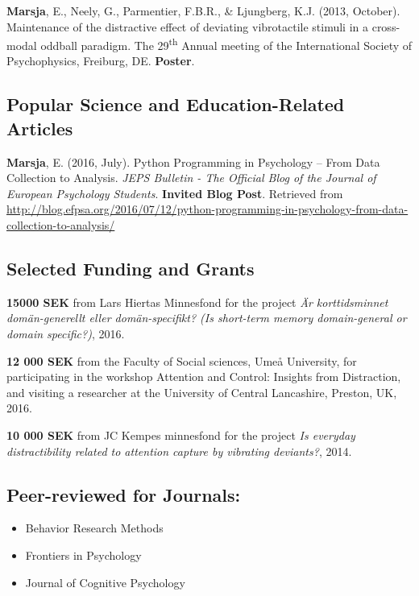 \documentclass[]{article}
\begin{document}
\textbf{Marsja}, E., Neely, G., Parmentier, F.B.R., \& Ljungberg, K.J.
(2013, October). Maintenance of the distractive effect of deviating
vibrotactile stimuli in a cross-modal oddball paradigm. The
29\textsuperscript{th} Annual meeting of the International Society of
Psychophysics, Freiburg, DE. \textbf{Poster}.

\hypertarget{popular-science-and-education-related-articles}{%
\subsection{Popular Science and Education-Related
Articles}\label{popular-science-and-education-related-articles}}

\textbf{Marsja}, E. (2016, July). Python Programming in Psychology --
From Data Collection to Analysis. \emph{JEPS Bulletin - The Official
Blog of the Journal of European Psychology Students}. \textbf{Invited
Blog Post}. Retrieved from \sloppy
\url{http://blog.efpsa.org/2016/07/12/python-programming-in-psychology-from-data-collection-to-analysis/}

\hypertarget{selected-funding-and-grants}{%
\subsection{Selected Funding and
Grants}\label{selected-funding-and-grants}}

\textbf{15000 SEK} from Lars Hiertas Minnesfond for the project \emph{Är
korttidsminnet domän-generellt eller domän-specifikt? (Is short-term
memory domain-general or domain specific?)}, 2016.

\textbf{12 000 SEK} from the Faculty of Social sciences, Umeå
University, for participating in the workshop Attention and Control:
Insights from Distraction, and visiting a researcher at the University
of Central Lancashire, Preston, UK, 2016.

\textbf{10 000 SEK} from JC Kempes minnesfond for the project \emph{Is
everyday distractibility related to attention capture by vibrating
deviants?}, 2014.

\hypertarget{peer-reviewed-for-journals}{%
\subsection{Peer-reviewed for
Journals:}\label{peer-reviewed-for-journals}}

\begin{itemize}
\item
  Behavior Research Methods
\item
  Frontiers in Psychology
\item
  Journal of Cognitive Psychology
\end{itemize}
\end{document}
